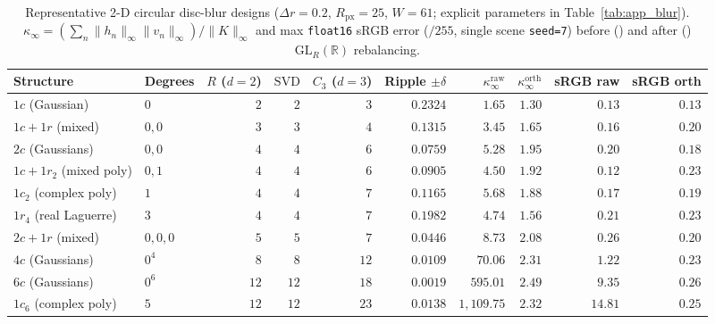 \documentclass[11pt,a4paper]{article}
\theoremstyle{plain}
\theoremstyle{definition}
\newcommand{\R}{\mathbb{R}}
\begin{document}
\begin{table}[h]
\centering
\caption{Representative 2-D circular disc-blur designs ($\Delta r = 0.2$, $R_{\mathrm{px}} = 25$, $W = 61$; explicit parameters in Table~\ref{tab:app_blur}). $\kappa_\infty = (\sum_n \|h_n\|_\infty \|v_n\|_\infty)/\|K\|_\infty$ and max \texttt{float16} sRGB error ($/255$, single scene \texttt{seed=7}) before () and after () $\mathrm{GL}_R(\R)$ rebalancing.}\label{tab:blur2d}
\smallskip
{\scriptsize\setlength{\tabcolsep}{3.4pt}
\begin{tabular}{@{}llrrrrrrrr@{}}
\toprule
Structure & Degrees & $R$ ($d{=}2$) & $\mathrm{SVD}$ & $C_3$ ($d{=}3$) & Ripple $\pm\delta$ & $\kappa_\infty^{\mathrm{raw}}$ & $\kappa_\infty^{\mathrm{orth}}$ & sRGB raw & sRGB orth \\
\midrule
$1c$ (Gaussian) & $0$ & $2$ & $2$ & $3$ & $0.2324$ & $1.65$ & $1.30$ & $0.13$ & $0.13$ \\
$1c + 1r$ (mixed) & $0,0$ & $3$ & $3$ & $4$ & $0.1315$ & $3.45$ & $1.65$ & $0.16$ & $0.20$ \\
$2c$ (Gaussians) & $0,0$ & $4$ & $4$ & $6$ & $0.0759$ & $5.28$ & $1.95$ & $0.20$ & $0.18$ \\
$1c + 1r_2$ (mixed poly) & $0,1$ & $4$ & $4$ & $6$ & $0.0905$ & $4.50$ & $1.92$ & $0.12$ & $0.23$ \\
$1c_2$ (complex poly) & $1$ & $4$ & $4$ & $7$ & $0.1165$ & $5.68$ & $1.88$ & $0.17$ & $0.19$ \\
$1r_4$ (real Laguerre) & $3$ & $4$ & $4$ & $7$ & $0.1982$ & $4.74$ & $1.56$ & $0.21$ & $0.23$ \\
$2c + 1r$ (mixed) & $0,0,0$ & $5$ & $5$ & $7$ & $0.0446$ & $8.73$ & $2.08$ & $0.26$ & $0.20$ \\
$4c$ (Gaussians) & $0^4$ & $8$ & $8$ & $12$ & $0.0109$ & $70.06$ & $2.31$ & $1.22$ & $0.23$ \\
$6c$ (Gaussians) & $0^6$ & $12$ & $12$ & $18$ & $0.0019$ & $595.01$ & $2.49$ & $9.35$ & $0.26$ \\
$1c_6$ (complex poly) & $5$ & $12$ & $12$ & $23$ & $0.0138$ & $1{,}109.75$ & $2.32$ & $14.81$ & $0.25$ \\
\bottomrule
\end{tabular}}
\end{table}
\end{document}
